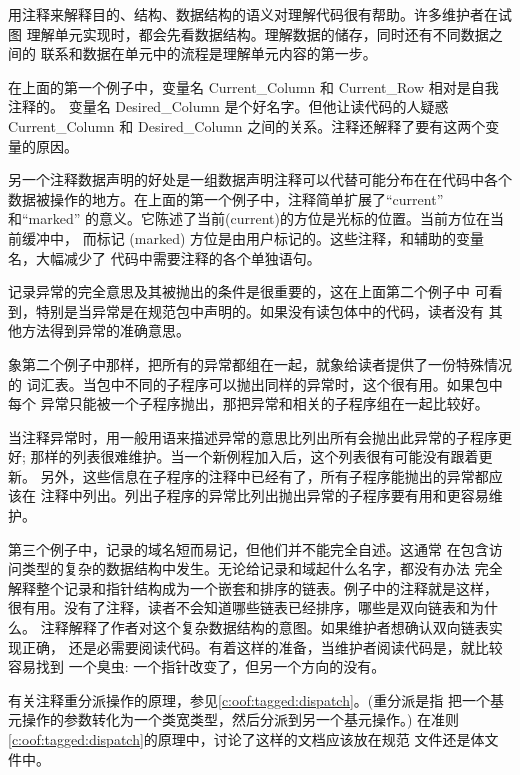 \begin{blockindent}
用注释来解释目的、结构、数据结构的语义对理解代码很有帮助。许多维护者在试图
理解单元实现时，都会先看数据结构。理解数据的储存，同时还有不同数据之间的
联系和数据在单元中的流程是理解单元内容的第一步。

在上面的第一个例子中，变量名 Current\_Column 和 Current\_Row 相对是自我注释的。
变量名 Desired\_Column 是个好名字。但他让读代码的人疑惑 Current\_Column 和
Desired\_Column 之间的关系。注释还解释了要有这两个变量的原因。

另一个注释数据声明的好处是一组数据声明注释可以代替可能分布在在代码中各个
数据被操作的地方。在上面的第一个例子中，注释简单扩展了``current'' 和``marked''
的意义。它陈述了当前(current)的方位是光标的位置。当前方位在当前缓冲中，
而标记 (marked) 方位是由用户标记的。这些注释，和辅助的变量名，大幅减少了
代码中需要注释的各个单独语句。

记录异常的完全意思及其被抛出的条件是很重要的，这在上面第二个例子中
可看到，特别是当异常是在规范包中声明的。如果没有读包体中的代码，读者没有
其他方法得到异常的准确意思。

象第二个例子中那样，把所有的异常都组在一起，就象给读者提供了一份特殊情况的
词汇表。当包中不同的子程序可以抛出同样的异常时，这个很有用。如果包中每个
异常只能被一个子程序抛出，那把异常和相关的子程序组在一起比较好。

当注释异常时，用一般用语来描述异常的意思比列出所有会抛出此异常的子程序更好;
那样的列表很难维护。当一个新例程加入后，这个列表很有可能没有跟着更新。
另外，这些信息在子程序的注释中已经有了，所有子程序能抛出的异常都应该在
注释中列出。列出子程序的异常比列出抛出异常的子程序要有用和更容易维护。

第三个例子中，记录的域名短而易记，但他们并不能完全自述。这通常
在包含访问类型的复杂的数据结构中发生。无论给记录和域起什么名字，都没有办法
完全解释整个记录和指针结构成为一个嵌套和排序的链表。例子中的注释就是这样，
很有用。没有了注释，读者不会知道哪些链表已经排序，哪些是双向链表和为什么。
注释解释了作者对这个复杂数据结构的意图。如果维护者想确认双向链表实现正确，
还是必需要阅读代码。有着这样的准备，当维护者阅读代码是，就比较容易找到
一个臭虫: 一个指针改变了，但另一个方向的没有。

有关注释重分派操作的原理，参见\ref{c:oof:tagged:dispatch}。(重分派是指
把一个基元操作的参数转化为一个类宽类型，然后分派到另一个基元操作。) 
在准则\ref{c:oof:tagged:dispatch}的原理中，讨论了这样的文档应该放在规范
文件还是体文件中。
\end{blockindent}

